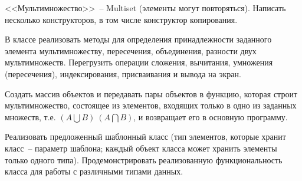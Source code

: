 
<<Мультимножество>>~-- Multiset (элементы могут повторяться). Написать несколько
конструкторов, в том числе конструктор копирования.

В классе реализовать методы для
определения принадлежности заданного элемента мультимножеству, пересечения,
объединения, разности двух мультимножеств. Перегрузить операции сложения,
вычитания, умножения (пересечения), индексирования, присваивания и вывода на экран.

Создать массив объектов и передавать пары объектов в функцию, которая строит
мультимножество, состоящее из элементов, входящих только в одно из заданных
множеств, т.е. $(A\bigcup B) \ (A\bigcap B)$, и возвращает его в основную программу.

Реализовать предложенный шаблонный класс (тип элементов, которые
хранит класс~-- параметр шаблона; каждый объект класса может хранить
элементы только одного типа). Продемонстрировать реализованную
функциональность класса для работы с различными типами данных.

